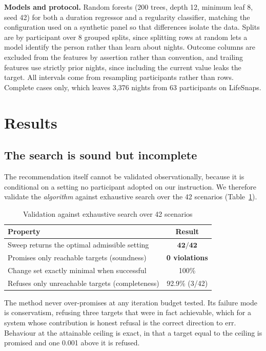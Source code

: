 \documentclass[conference,letterpaper]{IEEEtran}
\begin{document}
\textbf{Models and protocol.} Random forests (200 trees, depth 12, minimum leaf
8, seed 42) for both a duration regressor and a regularity classifier, matching
the configuration used on a synthetic panel so that differences isolate the
data. Splits are by participant over 8 grouped splits, since splitting rows at
random lets a model identify the person rather than learn about nights. Outcome
columns are excluded from the features by assertion rather than convention, and
trailing features use strictly prior nights, since including the current value
leaks the target. All intervals come from resampling participants rather than
rows. Complete cases only, which leaves 3,376 nights from 63 participants on
LifeSnaps.

\section{Results}
\label{sec:results}

\subsection{The search is sound but incomplete}
\label{sec:sound}

The recommendation itself cannot be validated observationally, because it is
conditional on a setting no participant adopted on our instruction. We therefore
validate the \emph{algorithm} against exhaustive search over the 42 scenarios
(Table~\ref{tab:sound}).

\begin{table}[t]
\caption{Validation against exhaustive search over 42 scenarios}
\label{tab:sound}
\centering
\small
\begin{tabular}{lc}
\toprule
Property & Result \\
\midrule
Sweep returns the optimal admissible setting & $\mathbf{42/42}$ \\
Promises only reachable targets (soundness) & \textbf{0 violations} \\
Change set exactly minimal when successful & 100\% \\
Refuses only unreachable targets (completeness) & 92.9\% (3/42) \\
\bottomrule
\end{tabular}
\end{table}

The method never over-promises at any iteration budget tested. Its failure mode
is conservatism, refusing three targets that were in fact achievable, which for
a system whose contribution is honest refusal is the correct direction to err.
Behaviour at the attainable ceiling is exact, in that a target equal to the
ceiling is promised and one 0.001 above it is refused.
\end{document}
